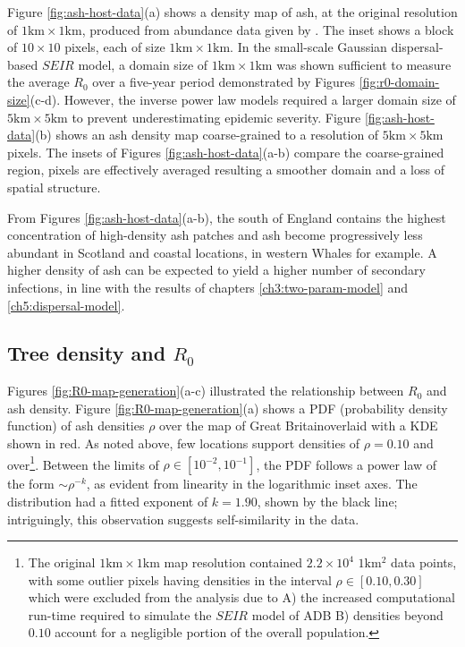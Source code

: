 Figure \ref{fig:ash-host-data}(a) shows a density map of ash, at the original resolution of $\mathrm{1km}\times \mathrm{1km}$, produced from abundance data given by \cite{hill.data}.
The inset shows a block of $10\times10$ pixels, each of size $1\mathrm{km} \times 1 \mathrm{km}$.
In the small-scale Gaussian dispersal-based $SEIR$ model, a domain size of $\mathrm{1km}\times \mathrm{1km}$ was shown sufficient to measure the average $R_0$ over a five-year period \textemdash demonstrated by Figures \ref{fig:r0-domain-size}(c-d).
However, the inverse power law models required a larger domain size of $\mathrm{5km}\times \mathrm{5km}$ to prevent underestimating epidemic severity.
Figure \ref{fig:ash-host-data}(b) shows an ash density map coarse-grained to a resolution of $\mathrm{5km}\times \mathrm{5km}$ pixels.
The insets of Figures \ref{fig:ash-host-data}(a-b) compare the coarse-grained region, pixels are effectively averaged resulting a smoother domain and a loss of spatial structure.

From Figures \ref{fig:ash-host-data}(a-b), the south of England contains the highest concentration of high-density ash patches and ash become progressively less abundant in Scotland and coastal locations, 
in western Whales for example. 
A higher density of ash can be expected to yield a higher number of secondary infections, in line with the results of chapters \ref{ch3:two-param-model} and \ref{ch5:dispersal-model}.

\subsection{Tree density and $R_0$}
\label{section:r0-tree-density}

Figures \ref{fig:R0-map-generation}(a-c) illustrated the relationship between $R_0$ and ash density.
Figure \ref{fig:R0-map-generation}(a) shows a PDF (probability density function) of ash densities $\rho$ over the map of Great Britain\textemdash overlaid with a KDE shown in red.
As noted above, few locations support densities of $\rho=0.10$ and over\footnote{
The original $\mathrm{1km \times 1km}$ map resolution contained $2.2\times 10^4$ $1\mathrm{km^2}$ data points, 
with some outlier pixels having densities in the interval $\rho \in [0.10, 0.30]$ which were excluded from the analysis due to 
A) the increased computational run-time required to simulate the $SEIR$ model of ADB  
B) densities beyond $0.10$ account for a negligible portion of the overall population.}. 
Between the limits of $\rho \in [10^{-2}, 10^{-1}]$, the PDF follows a power law of the form $\sim \rho ^{-k}$, as evident from linearity in the logarithmic inset axes.
The distribution had a fitted exponent of $k=1.90$, shown by the black line; 
intriguingly, this observation suggests self-similarity in the data.

